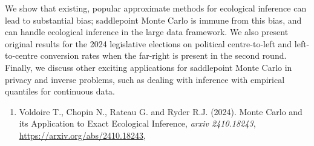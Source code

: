 \begin{talk}
We show that existing, popular approximate methods for ecological inference can
lead to substantial bias; saddlepoint Monte Carlo is immune from this bias, and 
can handle ecological inference in the large data framework. We also
present original results for the 2024 legislative elections on political
centre-to-left and left-to-centre conversion rates when the far-right is
present in the second round. Finally, we discuss other exciting applications
for saddlepoint Monte Carlo in privacy and inverse problems, such as dealing
with inference with empirical quantiles for continuous data.

\medskip

\begin{enumerate}
 \item[{[1]}] 
      Voldoire T., Chopin N., Rateau G. and Ryder R.J. (2024).
      Monte Carlo and its Application to Exact Ecological Inference, 
      \textit{arxiv 2410.18243},
      \url{https://arxiv.org/abs/2410.18243}, 
\end{enumerate}
\vspace{-10ex}
\end{talk}

